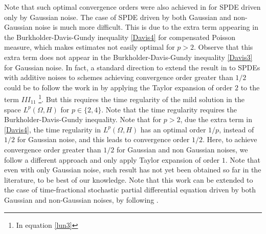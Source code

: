 \documentclass[review,12pt]{elsarticle}
\begin{document}
 Note that such optimal convergence orders were also achieved in \cite{Xiaojie2,Xiaojie3,Antjd2,AntonioRev1,AntonioRev2} for SPDE driven only by Gaussian noise.  The case of SPDE driven by both Gaussian and non-Gaussian noise is much more difficult. This is due to the extra term appearing in the Burkholder-Davis-Gundy inequality \eqref{Davis4} for compensated Poisson measure, which  makes estimates not easily optimal for $p>2$.  Observe that this extra term does not appear  in the Burkholder-Davis-Gundy inequality \eqref{Davis3} for Gaussian noise. In fact, a standard direction to extend the result in \cite{Yang} to SPDEs with additive noises to schemes achieving convergence order greater than $1/2$ could be to follow the work in \cite{Xiaojie2,Xiaojie3,AntonioRev1,AntonioRev2} by applying the Taylor expansion of order $2$ to the term $III_{11}$ \footnote{ In equation \eqref{lun3}}. But this requires the time regularity of the mild solution in the space $L^p(\Omega,H)$ for $p\in\{2,4\}$. Note that the time regularity requires the Burkholder-Davis-Gundy inequality. Note that for $p>2$, due the extra term in \eqref{Davis4},  the time regularity in $L^p(\Omega, H)$ has an optimal order $1/p$, instead of $1/2$ for Gaussian noise, and this  leads to convergence order $1/2$. Here, to achieve convergence order greater than $1/2$ for Gaussian and non Gaussian noises, we follow a different approach and only apply Taylor expansion of order $1$.  Note  that even with only Gaussian noise, such result has not yet  been obtained so far in the literature, to be best of our knowledge.
Note that this work can  be extended to the case of time-fractional stochastic partial differential equation driven  by both Gaussian  and non-Gaussian noises, by following  \cite{Zou1,Zou2}. 
\end{document}
